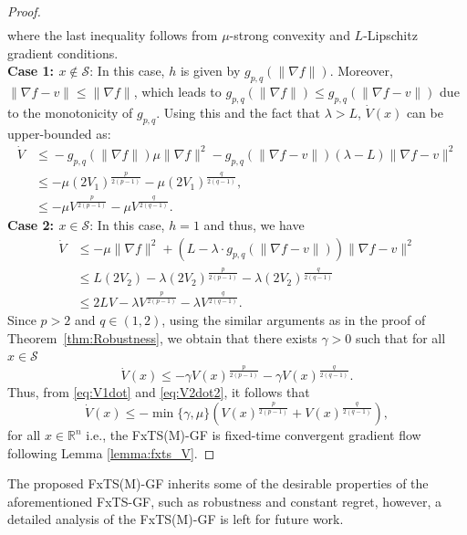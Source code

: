 \documentclass[letterpaper]{article}
\begin{document}
\begin{proof}
\begin{align*}
    \end{align*}
    where the last inequality follows from $\mu$-strong convexity and $L$-Lipschitz gradient conditions.\\
    {\bf Case 1: $x\notin \mathcal S$}: In this case, $h$ is given by $g_{p,q}(\|\nabla\!f\|)$. Moreover, $\|\nabla\!f\!-\!v\|\leq \|\nabla f\|$, which leads to $g_{p,q}(\|\nabla\!f\|)\leq g_{p,q}(\|\nabla\!f-v\|)$ due to the monotonicity of $g_{p,q}$. Using this and the fact that $\lambda>L$, $\dot{V}(x)$ can be upper-bounded as:
    \begin{align}\label{eq:V1dot}
        \dot{V} &\leq \!-g_{p,q}(\|\!\nabla\!f\!\|)\mu\|\nabla\!f\|^2\!-\! g_{p,q}(\|\!\nabla\!f\!-\!v\|)\!(\lambda\!-\!L)\!\|\nabla\!f\!-\!v\|^2\nonumber\\
        &\leq -\mu\left(2{V_1}\right)^{\frac{p}{2(p-1)}}-\mu\left(2{V_1}\right)^{\frac{q}{2(q-1)}}, \nonumber\\
        &\leq -\mu V^{\frac{p}{2(p-1)}}-\mu V^{\frac{q}{2(q-1)}}.
    \end{align}
    {\bf Case 2: $x\in \mathcal S$}: In this case, $h=1$ and thus, we have
    \begin{align}\label{eq:V2dot}
        \dot{V} &\leq -\mu\|\nabla\!f\|^2 + \left(L-\lambda\!\cdot\!g_{p,q}(\|\nabla\!f\!-\!v\|)\right)\|\nabla\!f\!-\!v\|^2\nonumber\\
        &\leq L\left(2{V_2}\right) - \lambda\left(2{V_2}\right)^{\frac{p}{2(p-1)}}- \lambda\left(2{V_2}\right)^{\frac{q}{2(q-1)}}\nonumber\\
        &\leq 2LV - \lambda V^{\frac{p}{2(p-1)}}- \lambda V^{\frac{q}{2(q-1)}}.
    \end{align}
    Since $p>2$ and $q\in(1,2)$, using the similar arguments as in the proof of Theorem~\ref{thm:Robustness}, we obtain that there exists $\gamma>0$ such that for all $x\in \mathcal S$
    \begin{equation}\label{eq:V2dot2}
        \dot{V}(x) \leq -\gamma V(x)^{\frac{p}{2(p-1)}}-\gamma V(x)^{\frac{q}{2(q-1)}}.
    \end{equation}
    Thus, from \eqref{eq:V1dot} and \eqref{eq:V2dot2}, it follows that
    \begin{equation}\label{eq:finalVdot}
        \dot{V}(x) \leq -\min\{\gamma,\mu\}\left(V(x)^{\frac{p}{2(p-1)}}+V(x)^{\frac{q}{2(q-1)}}\right),
    \end{equation}
    for all $x\in \mathbb R^n$
    i.e., the FxTS(M)-GF is fixed-time convergent gradient flow following Lemma \ref{lemma:fxts_V}.
\end{proof}\vspace{-.5em}
The proposed FxTS(M)-GF inherits some of the desirable properties of the aforementioned FxTS-GF, such as robustness and constant regret, however, a detailed analysis of the FxTS(M)-GF is left for future work.
\end{document}

